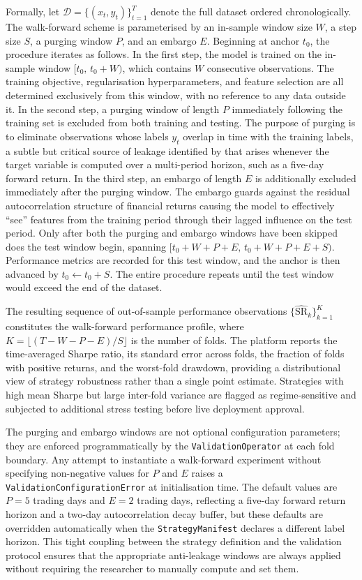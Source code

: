 \documentclass[12pt,openany]{book}
\numberwithin{equation}{chapter}
\theoremstyle{plain}
\theoremstyle{definition}
\theoremstyle{remark}
\begin{document}
Formally, let $\mathcal{D} = \{(x_t, y_t)\}_{t=1}^{T}$ denote the full dataset ordered chronologically. The walk-forward scheme is parameterised by an in-sample window size $W$, a step size $S$, a purging window $P$, and an embargo $E$. Beginning at anchor $t_0$, the procedure iterates as follows. In the first step, the model is trained on the in-sample window $[t_0,\, t_0 + W)$, which contains $W$ consecutive observations. The training objective, regularisation hyperparameters, and feature selection are all determined exclusively from this window, with no reference to any data outside it. In the second step, a purging window of length $P$ immediately following the training set is excluded from both training and testing. The purpose of purging is to eliminate observations whose labels $y_t$ overlap in time with the training labels, a subtle but critical source of leakage identified by \citet{Lopez2018} that arises whenever the target variable is computed over a multi-period horizon, such as a five-day forward return. In the third step, an embargo of length $E$ is additionally excluded immediately after the purging window. The embargo guards against the residual autocorrelation structure of financial returns causing the model to effectively ``see'' features from the training period through their lagged influence on the test period. Only after both the purging and embargo windows have been skipped does the test window begin, spanning $[t_0 + W + P + E,\, t_0 + W + P + E + S)$. Performance metrics are recorded for this test window, and the anchor is then advanced by $t_0 \leftarrow t_0 + S$. The entire procedure repeats until the test window would exceed the end of the dataset.

The resulting sequence of out-of-sample performance observations $\{\widehat{\text{SR}}_k\}_{k=1}^{K}$ constitutes the walk-forward performance profile, where $K = \lfloor (T - W - P - E) / S \rfloor$ is the number of folds. The platform reports the time-averaged Sharpe ratio, its standard error across folds, the fraction of folds with positive returns, and the worst-fold drawdown, providing a distributional view of strategy robustness rather than a single point estimate. Strategies with high mean Sharpe but large inter-fold variance are flagged as regime-sensitive and subjected to additional stress testing before live deployment approval.

The purging and embargo windows are not optional configuration parameters; they are enforced programmatically by the \texttt{ValidationOperator} at each fold boundary. Any attempt to instantiate a walk-forward experiment without specifying non-negative values for $P$ and $E$ raises a \texttt{ValidationConfigurationError} at initialisation time. The default values are $P = 5$ trading days and $E = 2$ trading days, reflecting a five-day forward return horizon and a two-day autocorrelation decay buffer, but these defaults are overridden automatically when the \texttt{StrategyManifest} declares a different label horizon. This tight coupling between the strategy definition and the validation protocol ensures that the appropriate anti-leakage windows are always applied without requiring the researcher to manually compute and set them.
\end{document}
